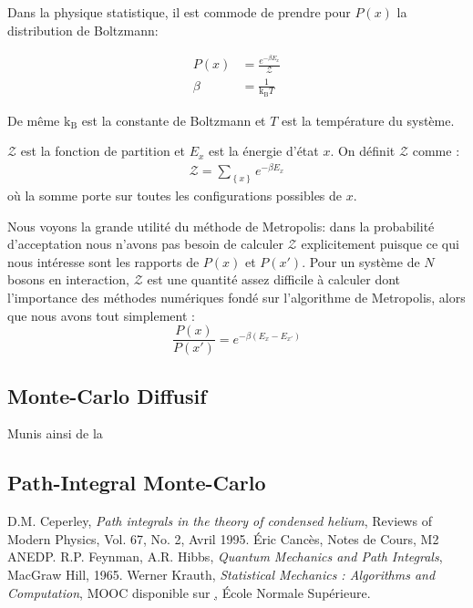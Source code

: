 \documentclass[11pt]{article}
\theoremstyle{definition}
\theoremstyle{remark}
\begin{document}
Dans la physique statistique, il est commode de prendre pour $P(x)$ la distribution de Boltzmann: 

\begin{align} 
\label{boltzmann_dist}
P(x) &= \frac{e^{-\beta E_x}}{\mathcal{Z}} \\
\beta &= \frac{1}{\mathrm{k_B}T}
\end{align}


De même $\mathrm{k_B}$ est la constante de Boltzmann et $T$ est la température du système. 

$\mathcal{Z}$ est la fonction de partition et $E_x$ est la énergie d'état $x$. 
On définit $\mathcal{Z}$ comme : 
\begin{align}
\label{partition}
\mathcal{Z}=\sum_{\left\lbrace x \right\rbrace} e^{-\beta E_x}
\end{align}
où la somme porte sur toutes les configurations possibles de $x$.

 Nous voyons la grande utilité du méthode de Metropolis: dans la probabilité d'acceptation nous n'avons pas besoin de calculer $\mathcal{Z}$ explicitement puisque ce qui nous intéresse sont les rapports de $P(x)$ et $P(x')$. Pour un système de $N$ bosons en interaction, $\mathcal{Z}$ est une quantité assez difficile à calculer dont l'importance des méthodes numériques fondé sur l'algorithme de Metropolis, alors que nous avons tout simplement :
\begin{equation}
 	\frac{P(x)}{P(x')}=e^{-\beta (E_x-E_{x'})}
\end{equation}
\subsection{Monte-Carlo Diffusif}
Munis ainsi de la 

\subsection{Path-Integral Monte-Carlo}

\newpage
\begin{thebibliography}{analytique}
D.M. Ceperley, \textit{Path integrals in the theory of condensed helium}, Reviews of Modern Physics, Vol. 67, No. 2, Avril 1995.
Éric Cancès, Notes de Cours, M2 ANEDP.
R.P. Feynman, A.R. Hibbs, \textit{Quantum Mechanics and Path Integrals}, MacGraw Hill, 1965.
 Werner Krauth, \textit{Statistical Mechanics : Algorithms and Computation}, MOOC disponible sur \href{http://coursera.org}, École Normale Supérieure. 
\end{thebibliography}
\end{document}
